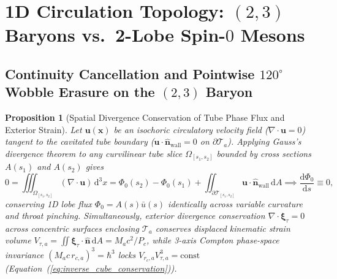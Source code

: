 \documentclass[11pt, a4paper]{article}
\newtheorem{proposition}[theorem]{Proposition}
\DeclareRobustCommand{\dd}{\mathrm{d}}
\begin{document}
\section{\texorpdfstring{1D Circulation Topology: $(2,3)$ Baryons vs.\ 2-Lobe Spin-$0$ Mesons}{1D Circulation Topology: (2,3) Baryons vs. 2-Lobe Spin-0 Mesons}}
\label{sec:1d_line}

\subsection{\texorpdfstring{Continuity Cancellation and Pointwise $120^\circ$ Wobble Erasure on the $(2,3)$ Baryon}{Continuity Cancellation and Pointwise 120-Degree Wobble Erasure}}


\begin{proposition}[Spatial Divergence Conservation of Tube Phase Flux and Exterior Strain]
\label{prop:spatial_divergence}
Let $\mathbf{u}(\mathbf{x})$ be an isochoric circulatory velocity field ($\nabla\cdot\mathbf{u} = 0$) tangent to the cavitated tube boundary ($\mathbf{u}\cdot\hat{\mathbf{n}}_{\mathrm{wall}} = 0$ on $\partial\mathcal{T}_a$). Applying Gauss's divergence theorem to any curvilinear tube slice $\Omega_{[s_1, s_2]}$ bounded by cross sections $A(s_1)$ and $A(s_2)$ gives
\begin{equation}
    0 = \iiint_{\Omega_{[s_1, s_2]}} (\nabla\cdot\mathbf{u})\,\dd^3x = \Phi_0(s_2) - \Phi_0(s_1) + \iint_{\partial\mathcal{T}_{[s_1,s_2]}} \mathbf{u}\cdot\hat{\mathbf{n}}_{\mathrm{wall}}\,\dd A \implies \frac{\dd\Phi_0}{\dd s} \equiv 0,
    \label{eq:flux_divergence_conservation}
\end{equation}
conserving 1D lobe flux $\Phi_0 = A(s)\bar{u}(s)$ identically across variable curvature and throat pinching. Simultaneously, exterior divergence conservation $\nabla\cdot\boldsymbol{\xi}_\tau = 0$ across concentric surfaces enclosing $\mathcal{T}_a$ conserves displaced kinematic strain volume $V_{\tau,a} = \iint \boldsymbol{\xi}_\tau\cdot\hat{\mathbf{n}}\,\dd A = M_a c^2/P_c$, while 3-axis Compton phase-space invariance $(M_a c\,r_{c,a})^3 = \hbar^3$ locks $V_{r_c,a}V_{\tau,a}^3 = \mathrm{const}$ (Equation~(\ref{eq:inverse_cube_conservation})).
\end{proposition}
\end{document}
